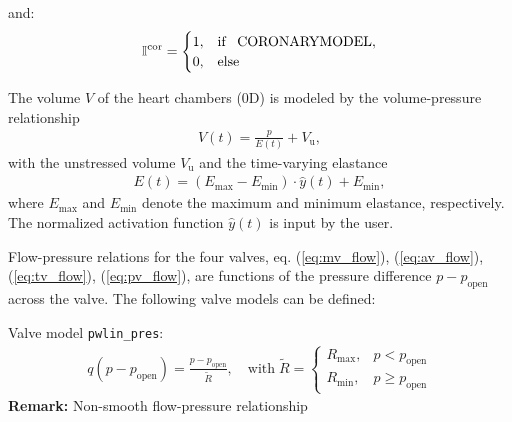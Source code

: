 \documentclass[a4paper,12pt]{report}
\begin{document}
and:
\begin{equation}
\begin{aligned}
\mathbb{I}^{\mathrm{cor}} = \begin{cases} 1, & \text{if \, CORONARYMODEL}, \\ 0, & \text{else} \end{cases}
\end{aligned}
\end{equation}

The volume $V$ of the heart chambers (0D) is modeled by the volume-pressure relationship
\begin{equation}
\begin{aligned}
V(t) = \frac{p}{E(t)} + V_{\mathrm{u}},
\end{aligned}
\end{equation}
with the unstressed volume $V_{\mathrm{u}}$ and the time-varying elastance
\begin{equation}
\label{equation-at-elast}
\begin{aligned}
E(t)=\left(E_{\mathrm{max}}-E_{\mathrm{min}}\right)\cdot \hat{y}(t)+E_{\mathrm{min}},
\end{aligned}
\end{equation}
where $E_{\mathrm{max}}$ and $E_{\mathrm{min}}$ denote the maximum and minimum elastance, respectively. The normalized activation function $\hat{y}(t)$ is input by the user.

Flow-pressure relations for the four valves, eq. (\ref{eq:mv_flow}), (\ref{eq:av_flow}), (\ref{eq:tv_flow}), (\ref{eq:pv_flow}), are functions of the pressure difference $p-p_{\mathrm{open}}$ across the valve. The following valve models can be defined:

Valve model \verb.pwlin_pres.:
\begin{equation}
\begin{aligned}
q(p-p_{\mathrm{open}}) = \frac{p-p_{\mathrm{open}}}{\tilde{R}}, \quad \text{with}\; \tilde{R} = \begin{cases} R_{\max}, & p < p_{\mathrm{open}} \\
R_{\min}, & p \geq p_{\mathrm{open}} \end{cases}
\end{aligned}
\end{equation}
\textbf{Remark:} Non-smooth flow-pressure relationship
\end{document}
